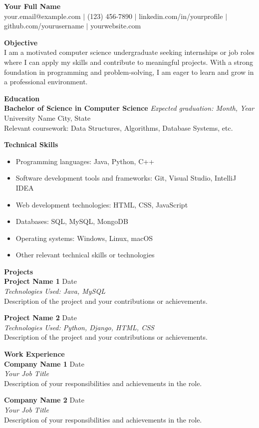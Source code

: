 \documentclass[11pt,a4paper]{article}
\makeatletter
\newcommand{\fullname}{Your Full Name}
\newcommand{\email}{your.email@example.com}
\newcommand{\phone}{(123) 456-7890}
\newcommand{\linkedin}{linkedin.com/in/yourprofile}
\newcommand{\github}{github.com/yourusername}
\newcommand{\website}{yourwebsite.com}
\newcommand{\ressection}[1]{\vspace{8pt}\large\textbf{#1}\vspace{4pt}\\}
\newcommand{\ressubsection}[3]{\textbf{#1} \hfill #2\\ \textit{#3}\\}
\makeatother
\begin{document}
\begin{center}
    \LARGE\textbf{\fullname}\\
    \vspace{4pt}
    \small\email{} $\vert$ \phone{} $\vert$ \linkedin{} $\vert$ \github{} $\vert$ \website{}
\end{center}

\ressection{Objective}
I am a motivated computer science undergraduate seeking internships or job roles where I can apply my skills and contribute to meaningful projects. With a strong foundation in programming and problem-solving, I am eager to learn and grow in a professional environment.

\ressection{Education}
\textbf{Bachelor of Science in Computer Science} \hfill \textit{Expected graduation: Month, Year}\\
University Name \hfill City, State\\
Relevant coursework: Data Structures, Algorithms, Database Systems, etc.

\ressection{Technical Skills}
\begin{itemize}[leftmargin=*]
    \item Programming languages: Java, Python, C++
    \item Software development tools and frameworks: Git, Visual Studio, IntelliJ IDEA
    \item Web development technologies: HTML, CSS, JavaScript
    \item Databases: SQL, MySQL, MongoDB
    \item Operating systems: Windows, Linux, macOS
    \item Other relevant technical skills or technologies
\end{itemize}

\ressection{Projects}
\ressubsection{Project Name 1}{Date}{Technologies Used: Java, MySQL}
Description of the project and your contributions or achievements.

\ressubsection{Project Name 2}{Date}{Technologies Used: Python, Django, HTML, CSS}
Description of the project and your contributions or achievements.

\ressection{Work Experience}
\ressubsection{Company Name 1}{Date}{Your Job Title}
Description of your responsibilities and achievements in the role.

\ressubsection{Company Name 2}{Date}{Your Job Title}
Description of your responsibilities and achievements in the role.
\end{document}
